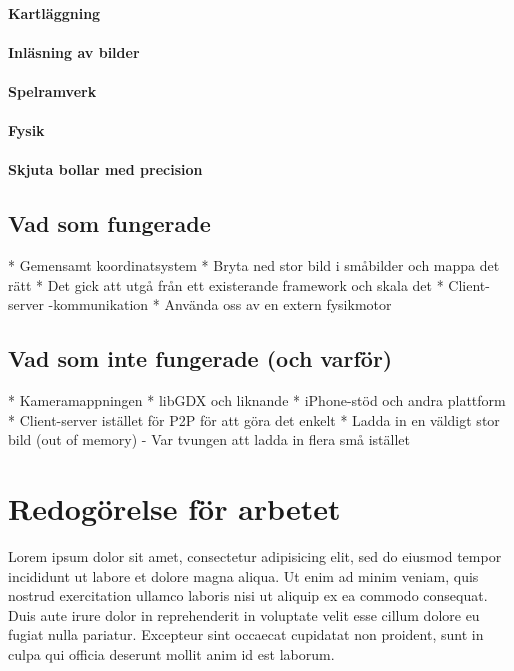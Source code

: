 \documentclass[a4paper,12pt,oneside,final]{extbook}
\begin{document}
\subsubsection{Kartläggning}
\subsubsection{Inläsning av bilder}
\subsubsection{Spelramverk}
\subsubsection{Fysik}
\subsubsection{Skjuta bollar med precision}

\section{Vad som fungerade}
* Gemensamt koordinatsystem
* Bryta ned stor bild i småbilder och mappa det rätt
* Det gick att utgå från ett existerande framework och skala det
* Client-server -kommunikation
* Använda oss av en extern fysikmotor

\section{Vad som inte fungerade (och varför)}

* Kameramappningen
* libGDX och liknande
* iPhone-stöd och andra plattform
* Client-server istället för P2P för att göra det enkelt
* Ladda in en väldigt stor bild (out of memory)
- Var tvungen att ladda in flera små istället

\chapter{Redogörelse för arbetet}

Lorem ipsum dolor sit amet, consectetur adipisicing elit, sed do eiusmod tempor incididunt ut labore et dolore magna aliqua. Ut enim ad minim veniam, quis nostrud exercitation ullamco laboris nisi ut aliquip ex ea commodo consequat. Duis aute irure dolor in reprehenderit in voluptate velit esse cillum dolore eu fugiat nulla pariatur. Excepteur sint occaecat cupidatat non proident, sunt in culpa qui officia deserunt mollit anim id est laborum.
\end{document}
